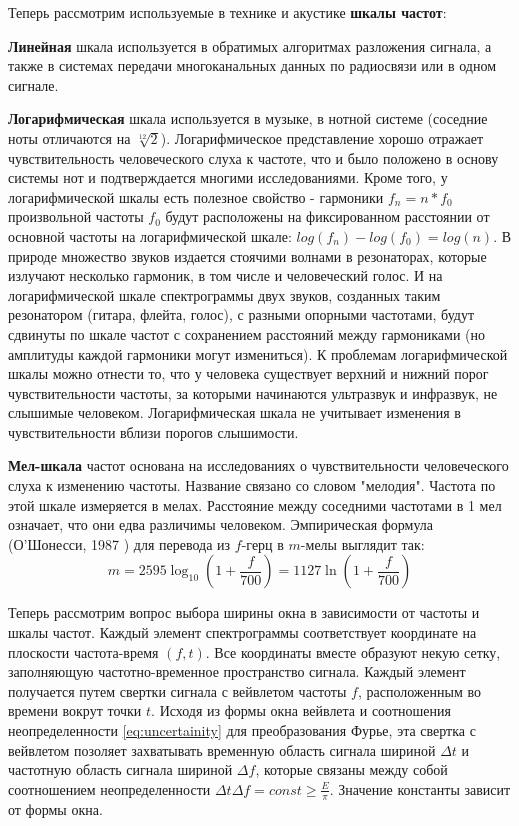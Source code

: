 Теперь рассмотрим используемые в технике и акустике \textbf{шкалы частот}:

\textbf{Линейная} шкала используется в обратимых алгоритмах разложения сигнала, а также в системах передачи многоканальных данных по радиосвязи или в одном сигнале.
  
\textbf{Логарифмическая} шкала используется в музыке, в нотной системе (соседние ноты отличаются на $\sqrt[12]{2}$). 
Логарифмическое представление хорошо отражает чувствительность человеческого слуха к частоте, что и было положено в основу системы нот и подтверждается многими исследованиями.
Кроме того, у логарифмической шкалы есть полезное свойство - гармоники $f_n = n * f_0$ произвольной частоты $f_0$ будут расположены на 
фиксированном расстоянии от основной частоты на логарифмической шкале:
$log(f_n) - log(f_0) = log(n)$. В природе множество звуков издается стоячими волнами в резонаторах, которые излучают несколько гармоник, в том числе и человеческий голос.
И на логарифмической шкале спектрограммы двух звуков, созданных таким резонатором (гитара, флейта, голос), с разными опорными частотами, 
будут сдвинуты по шкале частот с сохранением расстояний между гармониками (но амплитуды каждой гармоники могут измениться). 
К проблемам логарифмической шкалы можно отнести то, что у человека существует верхний и нижний порог чувствительности частоты, 
за которыми начинаются ультразвук и инфразвук, не слышимые человеком. 
Логарифмическая шкала не учитывает изменения в чувствительности вблизи порогов слышимости.

\textbf{Мел-шкала} \cite{MelScale} частот основана на исследованиях о чувствительности человеческого слуха к изменению частоты. Название связано со словом "мелодия".
Частота по этой шкале измеряется в мелах. Расстояние между соседними частотами в 1 мел означает, что они едва различимы человеком.
Эмпирическая формула (О'Шонесси, 1987 \cite{oshaughnessy1987speech}) для перевода из $f$-герц в $m$-мелы выглядит так:
\begin{equation}
  m = 2595 \log_{10}(1 + \frac{f}{700}) = 1127 \ln(1 + \frac{f}{700})
\end{equation}


Теперь рассмотрим вопрос выбора ширины окна в зависимости от частоты и шкалы частот. 
Каждый элемент спектрограммы соответствует координате на плоскости частота-время $(f, t)$. Все координаты вместе образуют некую сетку, 
заполняющую частотно-временное пространство сигнала. 
Каждый элемент получается путем свертки сигнала с вейвлетом частоты $f$, расположенным во времени вокрут точки $t$.  
Исходя из формы окна вейвлета и соотношения неопределенности \ref{eq:uncertainity} для преобразования Фурье, 
эта свертка с вейвлетом позоляет захватывать временную область сигнала шириной $\Delta t$ и частотную область сигнала шириной $\Delta f$, 
которые связаны между собой соотношением неопределенности $\Delta t \Delta f = const \geq {\frac {E}{\pi }}$. Значение константы зависит от формы окна.


